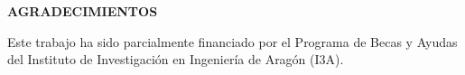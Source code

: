 \begin{center}
{\Large \bfseries AGRADECIMIENTOS}
\vspace{2.5cm}
\end{center}

Este trabajo ha sido parcialmente financiado por el Programa de Becas y Ayudas del Instituto de Investigación en Ingeniería de Aragón (I3A).
